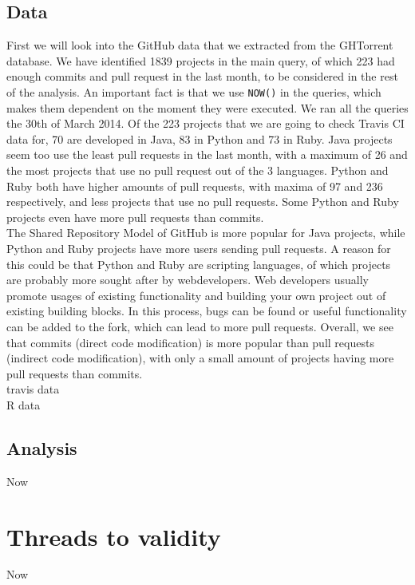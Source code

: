 \documentclass[a4paper,11pt]{article}
\begin{document}
		\subsection{Data}
			First we will look into the GitHub data that we extracted from the GHTorrent database. We have identified 1839 projects in the main query, of which 223 had enough commits and pull request in the last month, to be considered in the rest of the analysis. An important fact is that we use \texttt{NOW()} in the queries, which makes them dependent on the moment they were executed. We ran all the queries the 30th of March 2014. Of the 223 projects that we are going to check Travis CI data for, 70 are developed in Java, 83 in Python and 73 in Ruby. Java projects seem too use the least pull requests in the last month, with a maximum of 26 and the most projects that use no pull request out of the 3 languages. Python and Ruby both have higher amounts of pull requests, with maxima of 97 and 236 respectively, and less projects that use no pull requests. Some Python and Ruby projects even have more pull requests than commits. \\

			The Shared Repository Model of GitHub is more popular for Java projects, while Python and Ruby projects have more users sending pull requests. A reason for this could be that Python and Ruby are scripting languages, of which projects are probably more sought after by webdevelopers. Web developers usually promote usages of existing functionality and building your own project out of existing building blocks. In this process, bugs can be found or useful functionality can be added to the fork, which can lead to more pull requests. Overall, we see that commits (direct code modification) is more popular than pull requests (indirect code modification), with only a small amount of projects having more pull requests than commits. \\

			travis data \\

			R data
			
		\subsection{Analysis}
			Now 
			
	\section{Threads to validity}
		Now 
	
\end{document}
